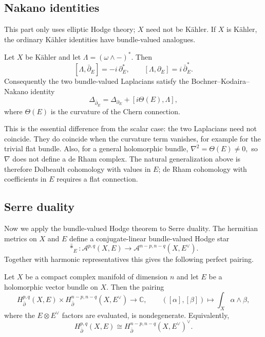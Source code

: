 \subsection{Nakano identities}
\label{subsection-nakano-identities}

\noindent
This part only uses elliptic Hodge theory;
$X$ need not be Kähler. If $X$ is Kähler,
the ordinary Kähler identities have
bundle-valued analogues.

\begin{theorem}
\label{theorem-nakano-identities}
Let $X$ be Kähler and let
$\Lambda=(\omega\wedge-)^*$. Then
$$
[\Lambda,\bar\partial_E]
=-i\,\partial_E^*,
\qquad
[\Lambda,\partial_E]
=i\,\bar\partial_E^*.
$$
Consequently the two bundle-valued
Laplacians satisfy the
Bochner--Kodaira--Nakano identity
$$
\Delta_{\bar\partial_E}
=
\Delta_{\partial_E}
+
[i\Theta(E),\Lambda],
$$
where $\Theta(E)$ is the curvature of the
Chern connection.
\end{theorem}

\noindent
This is the essential difference from the
scalar case: the two Laplacians need not
coincide. They do coincide when the curvature
term vanishes, for example for the trivial
flat bundle. Also, for a general holomorphic
bundle,
$
\nabla^2=\Theta(E)\neq0,
$
so $\nabla$ does not define a de Rham
complex. The natural generalization above is
therefore Dolbeault cohomology with values in
$E$; de Rham cohomology with coefficients in
$E$ requires a flat connection.

\subsection{Serre duality}
\label{subsection-serre-duality}

\medskip\noindent
Now we apply the bundle-valued Hodge theorem
to Serre duality. The hermitian metrics on
$X$ and $E$ define a conjugate-linear
bundle-valued Hodge star
$$
\bar *_{E}:
\mathcal A^{p,q}(X,E)
\longrightarrow
\mathcal A^{n-p,n-q}(X,E^\vee).
$$
Together with harmonic representatives this
gives the following perfect pairing.

\begin{theorem}
\label{proposition-serre-duality}
Let $X$ be a compact complex manifold of
dimension $n$ and let $E$ be a holomorphic
vector bundle on $X$. Then the pairing
$$
H^{p,q}_{\bar\partial}(X,E)
\times
H^{n-p,n-q}_{\bar\partial}(X,E^\vee)
\longrightarrow
\mathbb C,
\qquad
([\alpha],[\beta])
\longmapsto
\int_X \alpha\wedge\beta,
$$
where the $E\otimes E^\vee$ factors are
evaluated, is nondegenerate. Equivalently,
$$
H^{p,q}_{\bar\partial}(X,E)
\cong
H^{n-p,n-q}_{\bar\partial}(X,E^\vee)^\vee.
$$
\end{theorem}

